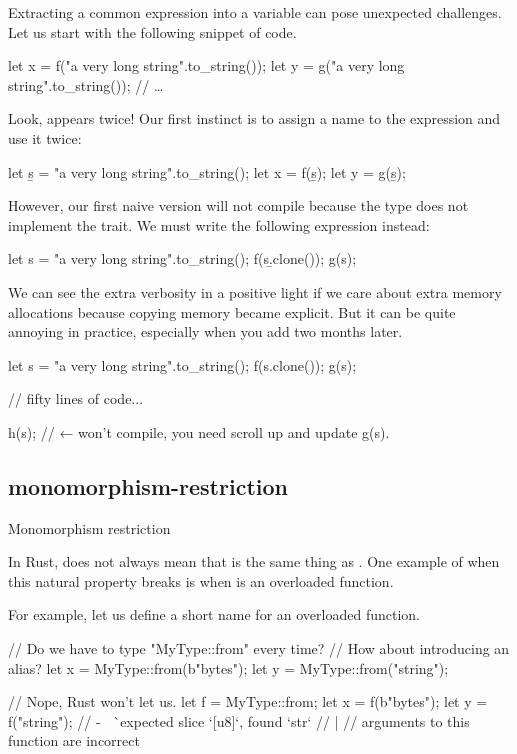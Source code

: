 \documentclass{article}
\begin{document}
Extracting a common expression into a variable can pose unexpected challenges.
Let us start with the following snippet of code.

\begin{code}[rust]
let x = f("a very long string".to_string());
let y = g("a very long string".to_string());
// \ldots
\end{code}

Look,  appears twice!
Our first instinct is to assign a name to the expression and use it twice:

\begin{code}[good]
let \b{s} = "a very long string".to_string();
let x = f(\b{s});
let y = g(\b{s});
\end{code}

However, our first naive version will not compile because the  type does not implement the  trait.
We must write the following expression instead:

\begin{code}[good]
let s = "a very long string".to_string();
f(s\b{.clone()});
g(s);
\end{code}

We can see the extra verbosity in a positive light if we care about extra memory allocations because copying memory became explicit.
But it can be quite annoying in practice, especially when you add  two months later.

\begin{code}[bad]
let s = "a very long string".to_string();
f(s.clone());
g(s);

// fifty lines of code...

h(s); // ← won't compile, you need scroll up and update g(s).
\end{code}

\subsection{monomorphism-restriction}{Monomorphism restriction}

In Rust,  does not always mean that  is the same thing as .
One example of when this natural property breaks is when  is an overloaded function.

For example, let us define a short name for an overloaded function.

\begin{code}[bad]
// Do we have to type "MyType::from" every time?
// How about introducing an alias?
let x = MyType::from(b"bytes");
let y = MyType::from("string");

// Nope, Rust won't let us.
let f = MyType::from;
let x = f(b"bytes");
let y = f("string");
//      - ^^^^^^^^ expected slice `[u8]`, found `str`
//      |
//      arguments to this function are incorrect
\end{code}
\end{document}
